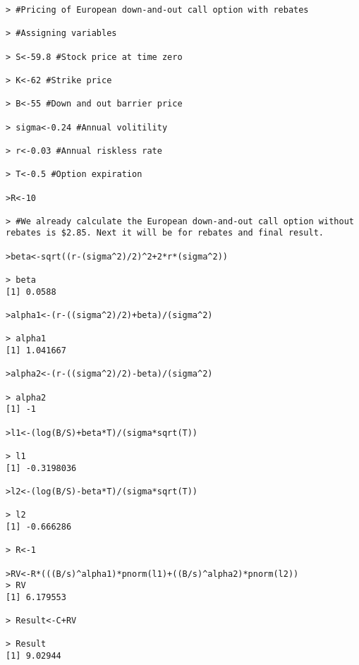 \begin{lstlisting}
> #Pricing of European down-and-out call option with rebates

> #Assigning variables

> S<-59.8 #Stock price at time zero 

> K<-62 #Strike price

> B<-55 #Down and out barrier price

> sigma<-0.24 #Annual volitility

> r<-0.03 #Annual riskless rate 

> T<-0.5 #Option expiration

>R<-10

> #We already calculate the European down-and-out call option without rebates is $2.85. Next it will be for rebates and final result.

>beta<-sqrt((r-(sigma^2)/2)^2+2*r*(sigma^2))

> beta
[1] 0.0588

>alpha1<-(r-((sigma^2)/2)+beta)/(sigma^2)

> alpha1
[1] 1.041667

>alpha2<-(r-((sigma^2)/2)-beta)/(sigma^2)

> alpha2
[1] -1

>l1<-(log(B/S)+beta*T)/(sigma*sqrt(T))

> l1
[1] -0.3198036

>l2<-(log(B/S)-beta*T)/(sigma*sqrt(T))

> l2
[1] -0.666286

> R<-1

>RV<-R*(((B/s)^alpha1)*pnorm(l1)+((B/s)^alpha2)*pnorm(l2))
> RV
[1] 6.179553

> Result<-C+RV

> Result
[1] 9.02944

\end{lstlisting}